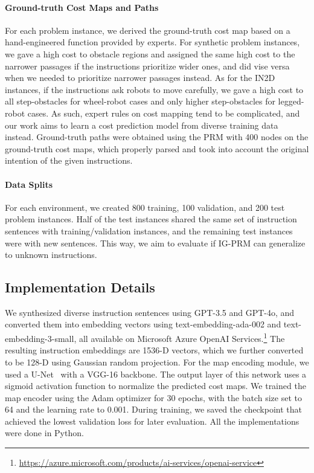 \paragraph{Ground-truth Cost Maps and Paths} 
For each problem instance, we derived the ground-truth cost map based on a hand-engineered function provided by experts. For synthetic problem instances, we gave a high cost to obstacle regions and assigned the same high cost to the narrower passages if the instructions prioritize wider ones, and did vise versa when we needed to prioritize narrower passages instead. As for the IN2D instances, if the instructions ask robots to move carefully, we gave a high cost to all step-obstacles for wheel-robot cases and only higher step-obstacles for legged-robot cases. As such, expert rules on cost mapping tend to be complicated, and our work aims to learn a cost prediction model from diverse training data instead. Ground-truth paths were obtained using the PRM with 400 nodes on the ground-truth cost maps, which properly parsed and took into account the original intention of the given instructions.

\paragraph{Data Splits} For each environment, we created 800 training, 100 validation, and 200 test problem instances. Half of the test instances shared the same set of instruction sentences with training/validation instances, and the remaining test instances were with new sentences. This way, we aim to evaluate if IG-PRM can generalize to unknown instructions.

\subsection{Implementation Details}
We synthesized diverse instruction sentences using GPT-3.5 and GPT-4o, and converted them into embedding vectors using text-embedding-ada-002 and text-embedding-3-small, all available on Microsoft Azure OpenAI Services.\footnote{\url{https://azure.microsoft.com/products/ai-services/openai-service}} The resulting instruction embeddings are 1536-D vectors, which we further converted to be 128-D using Gaussian random projection. For the map encoding module, we used a U-Net~\cite{ronneberger2015u} with a VGG-16 backbone. The output layer of this network uses a sigmoid activation function to normalize the predicted cost maps. We trained the map encoder using the Adam optimizer for 30 epochs, with the batch size set to 64 and the learning rate to 0.001. During training, we saved the checkpoint that achieved the lowest validation loss for later evaluation. All the implementations were done in Python.

